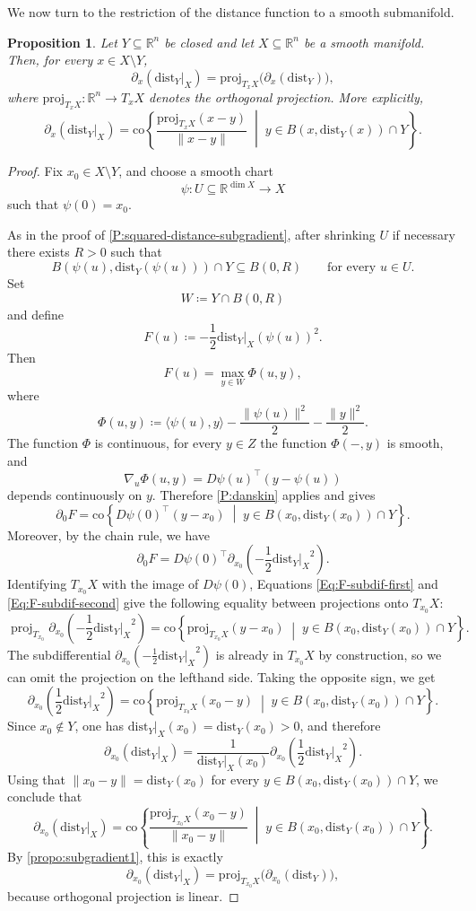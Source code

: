 \documentclass{amsart}
\newcommand{\R}{\mathbb{R}}
\newcommand{\dd}{\mathrm{dist}}
\newcommand{\dist}{{\mathrm{dist}_Y|_X}}
\newtheorem{proposition}[subsubsection]{Proposition}
\theoremstyle{definition}
\theoremstyle{remark}
\begin{document}
We now turn to the restriction of the distance function to a smooth submanifold.

\begin{proposition}\label{propo:subgradient2}
Let $Y \subseteq \R^n$ be closed and let $X \subseteq \R^n$ be a smooth manifold. Then, for every $x \in X \setminus Y$,
\[
\partial_x(\dist)=\mathrm{proj}_{T_xX}\bigl(\partial_x(\dd_Y)\bigr),
\]
where $\mathrm{proj}_{T_xX}\colon \R^n \to T_xX$ denotes the orthogonal projection. More explicitly,
\[
\partial_x(\dist)
=
\mathrm{co}\left\{
\frac{\mathrm{proj}_{T_xX}(x-y)}{\|x-y\|}
\;\middle|\;
y \in B(x,\dd_Y(x)) \cap Y
\right\}.
\]
\end{proposition}

\begin{proof}
Fix $x_0 \in X \setminus Y$, and choose a smooth chart
\[
\psi \colon U \subseteq \R^{\dim X} \to X
\]
such that $\psi(0)=x_0$.

As in the proof of \cref{P:squared-distance-subgradient}, after shrinking $U$ if necessary there exists $R>0$ such that
\[
B(\psi(u),\dd_Y(\psi(u))) \cap Y \subseteq B(0,R)
\qquad \text{for every } u \in U.
\]
Set
\[
W \coloneqq Y \cap B(0,R)
\]
and define
\[
F(u)\coloneqq -\frac{1}{2}\dd_Y|_X(\psi(u))^2.
\]
Then
\[
F(u)=\max_{y \in W}\Phi(u,y),
\]
where
\[
\Phi(u,y)\coloneqq
\langle \psi(u),y\rangle-\frac{\|\psi(u)\|^2}{2}-\frac{\|y\|^2}{2}.
\]
The function $\Phi$ is continuous, for every $y \in Z$ the function $\Phi(-,y)$ is smooth, and
\[
\nabla_u\Phi(u,y)=D\psi(u)^{\top}(y-\psi(u))
\]
depends continuously on $y$. Therefore \cref{P:danskin} applies and gives
\[
\label{Eq:F-subdif-first}
\partial_0F
=
\mathrm{co}\left\{
D\psi(0)^{\top}(y-x_0)
\;\middle|\;
y \in B(x_0,\dd_Y(x_0)) \cap Y
\right\}.
\]
Moreover, by the chain rule, we have
\[
\label{Eq:F-subdif-second}
\partial_0 F = D \psi(0)^\top \partial_{x_0} \left( -\frac{1}{2} \dist^2 \right).
\]
Identifying $T_{x_0} X$ with the image of $D \psi(0)$, Equations \eqref{Eq:F-subdif-first} and \eqref{Eq:F-subdif-second} give the following equality between projections onto $T_{x_0} X$:
\[
\operatorname{proj}_{T_{x_0}} \partial_{x_0} \left( -\frac{1}{2} \dist^2 \right) = \mathrm{co} \left\{
\mathrm{proj}_{T_{x_0}X} (y - x_0)
\;\middle|\;
y \in B(x_0, \dd_Y(x_0)) \cap Y
\right\}.
\]
The subdifferential $\partial_{x_0} \left( -\frac{1}{2} \dist^2 \right)$ is already in $T_{x_0} X$ by construction, so we can omit the projection on the lefthand side. Taking the opposite sign, we get
\[
\partial_{x_0}\left(\frac{1}{2}\dist^2\right)
=
\mathrm{co}\left\{
\mathrm{proj}_{T_{x_0}X}(x_0-y)
\;\middle|\;
y \in B(x_0,\dd_Y(x_0)) \cap Y
\right\}.
\]
Since $x_0 \notin Y$, one has $\dist(x_0)=\dd_Y(x_0)>0$, and therefore
\[
\partial_{x_0}(\dist)
=
\frac{1}{\dist(x_0)}
\partial_{x_0}\left(\frac{1}{2}\dist^2\right).
\]
Using that $\|x_0-y\|=\dd_Y(x_0)$ for every $y \in B(x_0,\dd_Y(x_0)) \cap Y$, we conclude that
\[
\partial_{x_0}(\dist)
=
\mathrm{co}\left\{
\frac{\mathrm{proj}_{T_{x_0}X}(x_0-y)}{\|x_0-y\|}
\;\middle|\;
y \in B(x_0,\dd_Y(x_0)) \cap Y
\right\}.
\]
By \cref{propo:subgradient1}, this is exactly
\[
\partial_{x_0}(\dist)=\mathrm{proj}_{T_{x_0}X}\bigl(\partial_{x_0}(\dd_Y)\bigr),
\]
because orthogonal projection is linear.
\end{proof}
\end{document}
